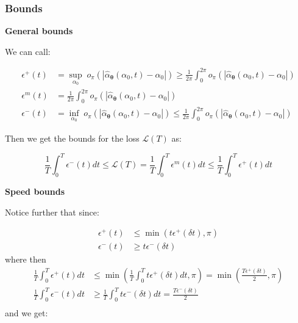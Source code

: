 \documentclass{article} %
\newcounter{ct}
\theoremstyle{definition}
\theoremstyle{remark}
\begin{document}
\subsubsection{Bounds}

\textbf{General bounds}

We can call:

\begin{equation}
\begin{split}
    \epsilon^+(t) &= \sup_{\alpha_0} \; o_\pi \left( \left| \hat{\alpha}_{\boldsymbol{\theta}}(\alpha_0, t) - \alpha_0  \right| \right) \geq \frac{1}{2 \pi} \int_0^{2 \pi}  o_\pi \left( \left| \hat{\alpha}_{\boldsymbol{\theta}}(\alpha_0, t) - \alpha_0  \right| \right)  \\
     \epsilon^{m}(t) &= \frac{1}{2 \pi} \int_0^{2 \pi}  o_\pi \left( \left| \hat{\alpha}_{\boldsymbol{\theta}}(\alpha_0, t) - \alpha_0  \right| \right) \\
    \epsilon^-(t) &= \inf_{\alpha_0} \; o_\pi \left( \left| \hat{\alpha}_{\boldsymbol{\theta}}(\alpha_0, t) - \alpha_0  \right| \right) \leq \frac{1}{2 \pi} \int_0^{2 \pi}  o_\pi \left( \left| \hat{\alpha}_{\boldsymbol{\theta}}(\alpha_0, t) - \alpha_0  \right| \right)
\end{split}
\end{equation}

Then we get the bounds for the loss $\mathcal{L}(T)$ as:

\begin{equation}
    \frac{1}{T} \int_0^{T} \epsilon^-(t)dt \leq \mathcal{L}(T) = \frac{1}{T} \int_0^{T} \epsilon^{m}(t) dt \leq  \frac{1}{T} \int_0^{T} \epsilon^+(t) dt
\end{equation}


\textbf{Speed bounds}

Notice further that since:

\begin{equation}
\begin{split}
    \epsilon^+(t) &\leq \min(t\epsilon^+(\delta t), \pi) \\
    \epsilon^-(t) &\geq t\epsilon^-(\delta t)
\end{split}
\end{equation}
where 
then 
\begin{equation}
\begin{split}
    \frac{1}{T} \int_0^{T} \epsilon^+(t)dt &\leq  \min \left( \frac{1}{T} \int_0^{T} t\epsilon^+(\delta t)dt, \pi \right) = \min \left( \frac{T \epsilon^+(\delta t)}{2}, \pi \right) \\
    \frac{1}{T} \int_0^{T} \epsilon^-(t)dt &\geq  \frac{1}{T} \int_0^{T} t\epsilon^-(\delta t)dt  = \frac{T \epsilon^-(\delta t)}{2} \\
\end{split}
\end{equation}
and we get: 
\end{document}
